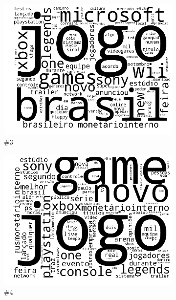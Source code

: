 \documentclass[
    12pt,                %
    oneside,            %
    a4paper,            %
    english,            %
    brazil                %
    ]{abntex2ppgsi}
\begin{document}
\begin{figure}[H]
\begin{subfigure}[b]{0.15\textwidth}
        \includegraphics[width=\textwidth]{img/ovnmtf-nc-1-tc-3.png}
        \caption{\#3}
    \end{subfigure}
    \begin{subfigure}[b]{0.15\textwidth}
        \includegraphics[width=\textwidth]{img/ovnmtf-nc-1-tc-4.png}
        \caption{\#4}
    \end{subfigure}
    \begin{subfigure}[b]{0.15\textwidth}

\end{subfigure}
\end{figure}
\end{document}

